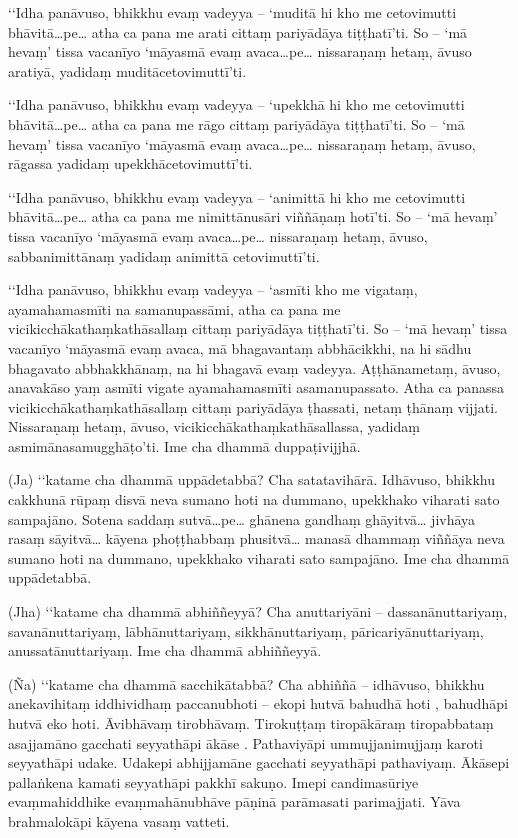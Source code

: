 ‘‘Idha panāvuso, bhikkhu evaṃ vadeyya – ‘muditā hi kho me cetovimutti bhāvitā…pe… atha ca pana me arati cittaṃ pariyādāya tiṭṭhatī’ti. So – ‘mā hevaṃ’ tissa vacanīyo ‘māyasmā evaṃ avaca…pe… nissaraṇaṃ hetaṃ, āvuso aratiyā, yadidaṃ muditācetovimuttī’ti.

‘‘Idha panāvuso, bhikkhu evaṃ vadeyya – ‘upekkhā hi kho me cetovimutti bhāvitā…pe… atha ca pana me rāgo cittaṃ pariyādāya tiṭṭhatī’ti. So – ‘mā hevaṃ’ tissa vacanīyo ‘māyasmā evaṃ avaca…pe… nissaraṇaṃ hetaṃ, āvuso, rāgassa yadidaṃ upekkhācetovimuttī’ti.

‘‘Idha panāvuso, bhikkhu evaṃ vadeyya – ‘animittā hi kho me cetovimutti bhāvitā…pe… atha ca pana me nimittānusāri viññāṇaṃ hotī’ti. So – ‘mā hevaṃ’ tissa vacanīyo ‘māyasmā evaṃ avaca…pe… nissaraṇaṃ hetaṃ, āvuso, sabbanimittānaṃ yadidaṃ animittā cetovimuttī’ti.

‘‘Idha panāvuso, bhikkhu evaṃ vadeyya – ‘asmīti kho me vigataṃ, ayamahamasmīti na samanupassāmi, atha ca pana me vicikicchākathaṃkathāsallaṃ cittaṃ pariyādāya tiṭṭhatī’ti. So – ‘mā hevaṃ’ tissa vacanīyo ‘māyasmā evaṃ avaca, mā bhagavantaṃ abbhācikkhi, na hi sādhu bhagavato abbhakkhānaṃ, na hi bhagavā evaṃ vadeyya. Aṭṭhānametaṃ, āvuso, anavakāso yaṃ asmīti vigate ayamahamasmīti asamanupassato. Atha ca panassa vicikicchākathaṃkathāsallaṃ cittaṃ pariyādāya ṭhassati, netaṃ ṭhānaṃ vijjati. Nissaraṇaṃ hetaṃ, āvuso, vicikicchākathaṃkathāsallassa, yadidaṃ asmimānasamugghāṭo’ti. Ime cha dhammā duppaṭivijjhā.

(Ja) ‘‘katame cha dhammā uppādetabbā? Cha satatavihārā. Idhāvuso, bhikkhu cakkhunā rūpaṃ disvā neva sumano hoti na dummano, upekkhako viharati sato sampajāno. Sotena saddaṃ sutvā…pe… ghānena gandhaṃ ghāyitvā… jivhāya rasaṃ sāyitvā… kāyena phoṭṭhabbaṃ phusitvā… manasā dhammaṃ viññāya neva sumano hoti na dummano, upekkhako viharati sato sampajāno. Ime cha dhammā uppādetabbā.

(Jha) ‘‘katame cha dhammā abhiññeyyā? Cha anuttariyāni – dassanānuttariyaṃ, savanānuttariyaṃ, lābhānuttariyaṃ, sikkhānuttariyaṃ, pāricariyānuttariyaṃ, anussatānuttariyaṃ. Ime cha dhammā abhiññeyyā.

(Ña) ‘‘katame cha dhammā sacchikātabbā? Cha abhiññā – idhāvuso, bhikkhu anekavihitaṃ iddhividhaṃ paccanubhoti – ekopi hutvā bahudhā hoti , bahudhāpi hutvā eko hoti. Āvibhāvaṃ tirobhāvaṃ. Tirokuṭṭaṃ tiropākāraṃ tiropabbataṃ asajjamāno gacchati seyyathāpi ākāse . Pathaviyāpi ummujjanimujjaṃ karoti seyyathāpi udake. Udakepi abhijjamāne gacchati seyyathāpi pathaviyaṃ. Ākāsepi pallaṅkena kamati seyyathāpi pakkhī sakuṇo. Imepi candimasūriye evaṃmahiddhike evaṃmahānubhāve pāṇinā parāmasati parimajjati. Yāva brahmalokāpi kāyena vasaṃ vatteti.


